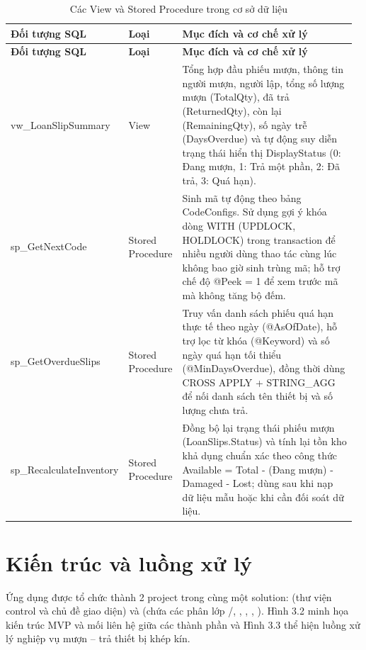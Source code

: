 {\small\setlength{\tabcolsep}{3pt}\renewcommand{\arraystretch}{1.25}
\begin{longtable}{|>{\raggedright\arraybackslash}p{0.233\linewidth}|>{\raggedright\arraybackslash}p{0.155\linewidth}|>{\raggedright\arraybackslash}p{0.582\linewidth}|}
\caption{Các View và Stored Procedure trong cơ sở dữ liệu}\\
\hline
\rowcolor{gray!25}\textbf{\textbf{Đối tượng SQL}} & \textbf{\textbf{Loại}} & \textbf{\textbf{Mục đích và cơ chế xử lý}} \\ \hline
\endfirsthead
\hline
\rowcolor{gray!25}\textbf{\textbf{Đối tượng SQL}} & \textbf{\textbf{Loại}} & \textbf{\textbf{Mục đích và cơ chế xử lý}} \\ \hline
\endhead
\hline\endfoot
vw\_LoanSlipSummary & View & Tổng hợp đầu phiếu mượn, thông tin người mượn, người lập, tổng số lượng mượn (TotalQty), đã trả (ReturnedQty), còn lại (RemainingQty), số ngày trễ (DaysOverdue) và tự động suy diễn trạng thái hiển thị DisplayStatus (0: Đang mượn, 1: Trả một phần, 2: Đã trả, 3: Quá hạn). \\ \hline
sp\_GetNextCode & Stored Procedure & Sinh mã tự động theo bảng CodeConfigs. Sử dụng gợi ý khóa dòng WITH (UPDLOCK, HOLDLOCK) trong transaction để nhiều người dùng thao tác cùng lúc không bao giờ sinh trùng mã; hỗ trợ chế độ @Peek = 1 để xem trước mã mà không tăng bộ đếm. \\ \hline
sp\_GetOverdueSlips & Stored Procedure & Truy vấn danh sách phiếu quá hạn thực tế theo ngày (@AsOfDate), hỗ trợ lọc từ khóa (@Keyword) và số ngày quá hạn tối thiểu (@MinDaysOverdue), đồng thời dùng CROSS APPLY + STRING\_AGG để nối danh sách tên thiết bị và số lượng chưa trả. \\ \hline
sp\_RecalculateInventory & Stored Procedure & Đồng bộ lại trạng thái phiếu mượn (LoanSlips.Status) và tính lại tồn kho khả dụng chuẩn xác theo công thức Available = Total - (Đang mượn) - Damaged - Lost; dùng sau khi nạp dữ liệu mẫu hoặc khi cần đối soát dữ liệu. \\ \hline
\end{longtable}
}

\section{Kiến trúc và luồng xử lý}

Ứng dụng được tổ chức thành 2 project trong cùng một solution:  (thư viện control và chủ đề giao diện) và  (chứa các phân lớp /, , , , ). Hình 3.2 minh họa kiến trúc MVP và mối liên hệ giữa các thành phần và Hình 3.3 thể hiện luồng xử lý nghiệp vụ mượn – trả thiết bị khép kín.


